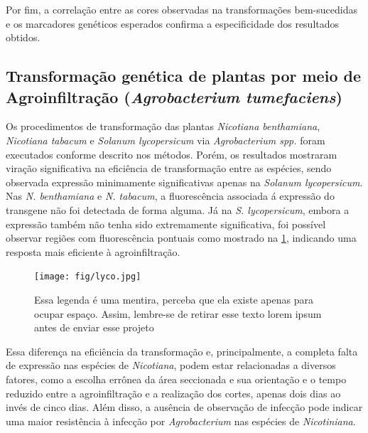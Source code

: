 Por fim, a correlação entre as cores observadas na transformações bem-sucedidas
e os marcadores genéticos esperados confirma a especificidade dos resultados
obtidos.

\subsection{Transformação genética de plantas por meio de Agroinfiltração (\textit{Agrobacterium tumefaciens})}
Os procedimentos de transformação das plantas \textit{Nicotiana benthamiana},
\textit{Nicotiana tabacum} e \textit{Solanum lycopersicum} via
\textit{Agrobacterium spp.} foram executados conforme descrito nos métodos.
Porém, os resultados mostraram viração significativa na eficiência de
transformação entre as espécies, sendo observada expressão minimamente
significativas apenas na \textit{Solanum lycopersicum}.  Nas \textit{N.
benthamiana} e \textit{N. tabacum}, a fluorescência associada á expressão do
transgene não foi detectada de forma alguma. Já na \textit{S.  lycopersicum},
embora a expressão também não tenha sido extremamente significativa, foi
possível observar regiões com fluorescência pontuais como mostrado na
\cref{lyco}, indicando uma resposta mais eficiente à agroinfiltração.

\begin{figure}
    \centering
    \texttt{[image: fig/lyco.jpg]}
    \caption{Essa legenda é uma mentira, perceba que ela existe apenas para
    ocupar espaço. Assim, lembre-se de retirar esse texto lorem ipsum antes de
enviar esse projeto} %
    \label{lyco}
\end{figure}

Essa diferença na eficiência da transformação e, principalmente, a completa
falta de expressão nas espécies de \textit{Nicotiana}, podem estar relacionadas a
diversos fatores, como a escolha errônea da área seccionada e sua orientação e o
tempo reduzido entre a agroinfiltração e a realização dos cortes, apenas dois
dias ao invés de cinco dias. Além disso, a ausência de observação de infecção pode indicar uma maior resistência à infecção
por \textit{Agrobacterium} nas espécies de \textit{Nicotiniana}.

